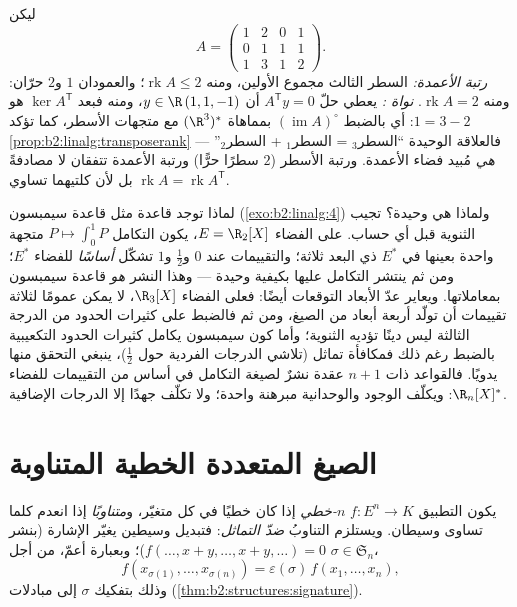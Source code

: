 \begin{example}\label{ex:b2:linalg:rankbothsides}
ليكن
\[
A = \begin{pmatrix}
1 & 2 & 0 & 1\\
0 & 1 & 1 & 1\\
1 & 3 & 1 & 2
\end{pmatrix} .
\]
\emph{رتبة الأعمدة:} السطر الثالث مجموع الأولين، ومنه
$\operatorname{rk} A \leq 2$؛ والعمودان $1$ و$2$ حرّان:
ومنه $\operatorname{rk} A = 2$. \emph{نواة :} يعطي حلّ
$A^{\mathsf T}y = 0$ أن $y \in \R\,(1, 1, -1)$، ومنه فبعد $\ker
A^{\mathsf T}$ هو $1 = 3 - 2$: أي بالضبط
$(\operatorname{im} A)^\circ$ بمماهاة
$(\R^3)^*$ مع متجهات الأسطر، كما تؤكد
\cref{prop:b2:linalg:transposerank} --- فالعلاقة الوحيدة
``السطر$_3$ = السطر$_1$ + السطر$_2$'' \emph{هي}
مُبيد فضاء الأعمدة. ورتبة الأسطر ($2$ سطرًا حرًّا) ورتبة
الأعمدة تتفقان لا مصادفةً بل لأن كلتيهما تساوي
$\operatorname{rk} A = \operatorname{rk} A^{\mathsf T}$.
\end{example}

\begin{example}\label{ex:b2:linalg:quadratureread}
لماذا توجد قاعدة مثل قاعدة سيمبسون (\cref{exo:b2:linalg:4})
ولماذا هي وحيدة؟ تجيب الثنوية قبل أي حساب.
على الفضاء $E = \R_2[X]$، يكون التكامل $P \mapsto \int_0^1 P$ متجهة
واحدة بعينها في  $E^*$ ذي البعد ثلاثة؛ والتقييمات
عند $0$ و$\frac12$ و$1$ تشكّل \emph{أساسًا} للفضاء
$E^*$؛ ومن ثم ينتشر التكامل عليها بكيفية وحيدة --- وهذا
النشر \emph{هو} قاعدة سيمبسون بمعاملاتها. ويعاير عدّ الأبعاد
التوقعات أيضًا: فعلى الفضاء $\R_3[X]$،
لا يمكن عمومًا لثلاثة تقييمات أن تولّد أربعة أبعاد من الصيغ،
ومن ثم فالضبط على كثيرات الحدود من الدرجة الثالثة ليس دينًا
تؤديه الثنوية؛ وأما كون سيمبسون يكامل كثيرات الحدود التكعيبية
بالضبط رغم ذلك فمكافأة تماثل (تلاشي الدرجات الفردية حول
$\frac12$)، ينبغي التحقق منها يدويًا. فالقواعد ذات $n + 1$ عقدة نشرٌ
لصيغة التكامل في أساس من التقييمات للفضاء $\R_n[X]^*$:
ويكلّف الوجود والوحدانية مبرهنة  واحدة؛ ولا تكلّف
جهدًا إلا الدرجات الإضافية.
\end{example}

\section{الصيغ المتعددة الخطية المتناوبة}

\begin{definition}\label{def:b2:linalg:alternating}
يكون التطبيق $f \colon E^n \to K$ \emph{$n$-خطي} إذا كان خطيًا في
كل متغيّر، و\emph{متناوبًا} إذا
انعدم كلما تساوى وسيطان. ويستلزم التناوبُ
\emph{ضدّ التماثل}: فتبديل وسيطين يغيّر الإشارة
(بنشر $f(\dots, x + y, \dots, x + y, \dots) = 0$)؛ وبعبارة أعمّ، من أجل
$\sigma \in \mathfrak{S}_n$،
\[
f(x_{\sigma(1)}, \dots, x_{\sigma(n)}) =
\varepsilon(\sigma)\, f(x_1, \dots, x_n),
\]
وذلك بتفكيك $\sigma$ إلى مبادلات
(\cref{thm:b2:structures:signature}).
\end{definition}

